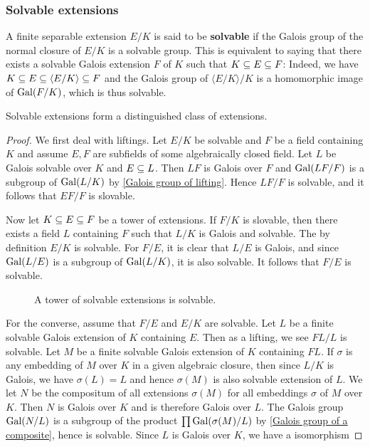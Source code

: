 \subsubsection{Solvable extensions}
A finite separable extension $E/K$ is said to be \textbf{solvable} if the Galois group of the normal closure of $E/K$ is a solvable group. This is equivalent to saying that there exists a solvable Galois extension $F$ of $K$ such that $K\subseteq E\subseteq F$: Indeed, we have $K\subseteq E\subseteq \langle E/K\rangle\subseteq F$ and the Galois group of $\langle E/K\rangle/K$ is a homomorphic image of $\mathrm{Gal}(F/K)$, which is thus solvable.
\begin{proposition}\label{field ext solvable distinguished}
Solvable extensions form a distinguished class of extensions.
\end{proposition}
\begin{proof}
We first deal with liftings. Let $E/K$ be solvable and $F$ be a field containing $K$ and assume $E,F$ are subfields of some algebraically closed field. Let $L$ be Galois solvable over $K$ and $E\subseteq L$. Then $LF$ is Galois over $F$ and $\mathrm{Gal}(LF/F)$ is a subgroup of $\mathrm{Gal}(L/K)$ by \cref{Galois group of lifting}. Hence $LF/F$ is solvable, and it follows that $EF/F$ is slovable.\par
Now let $K\subseteq E\subseteq F$ be a tower of extensions. If $F/K$ is slovable, then there exists a field $L$ containing $F$ such that $L/K$ is Galois and solvable. The by definition $E/K$ is solvable. For $F/E$, it is clear that $L/E$ is Galois, and since $\mathrm{Gal}(L/E)$ is a subgroup of $\mathrm{Gal}(L/K)$, it is also solvable. It follows that $F/E$ is solvable.\par
\vspace{-3pt}
\begin{figure}[htbp]
\centering
{}
\caption{A tower of solvable extensions is solvable.}
\end{figure}
\vspace{-3pt}
For the converse, assume that $F/E$ and $E/K$ are solvable. Let $L$ be a finite solvable Galois extension of $K$ containing $E$. Then as a lifting, we see $FL/L$ is solvable. Let $M$ be a finite solvable Galois extension of $K$ containing $FL$. If $\sigma$ is any embedding of $M$ over $K$ in a given algebraic closure, then since $L/K$ is Galois, we have $\sigma(L)=L$ and hence $\sigma(M)$ is also solvable extension of $L$. We let $N$ be the compositum of all extensions $\sigma(M)$ for all embeddings $\sigma$ of $M$ over $K$. Then $N$ is Galois over $K$ and is therefore Galois over $L$. The Galois group $\mathrm{Gal}(N/L)$ is a subgroup of the product $\prod\mathrm{Gal}(\sigma(M)/L)$ by \cref{Galois group of a composite}, hence is solvable. Since $L$ is Galois over $K$, we have a isomorphism

\end{proof}
